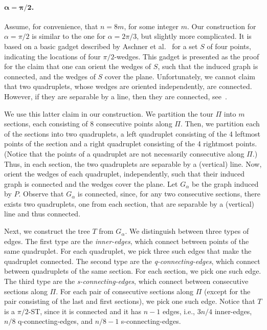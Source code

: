 \documentclass[11pt]{article}
\begin{document}
\paragraph{$\boldsymbol{\alpha=\pi/2}$.}
Assume, for convenience, that $n = 8m$, for some integer $m$.
Our construction for $\alpha=\pi/2$ is similar to the one for $\alpha=2\pi/3$, but slightly more complicated. It is based on a basic gadget described by Aschner et al.~\cite{AKM13} for a set $S$ of four points, indicating the locations of four $\pi/2$-wedges. This gadget is presented as the proof for the claim that one can orient the wedges of $S$, such that the induced graph is connected, and the wedges of $S$ cover the plane.
Unfortunately, we cannot claim that two quadruplets, whose wedges are oriented independently, are connected. However, if they are separable by a line, then they are connected, see~\cite{AKM13}. 

We use this latter claim in our construction.
We partition the tour $\Pi$ into $m$ sections, each consisting of 8 consecutive points along $\Pi$. Then, we partition each of the sections into two quadruplets, a left quadruplet consisting of the 4 leftmost points of the section and a right quadruplet consisting of the 4 rightmost points. (Notice that the points of a quadruplet are not necessarily consecutive along $\Pi$.) Thus, in each section, the two quadruplets are separable by a (vertical) line. Now, orient the wedges of each quadruplet, independently, such that their induced graph is connected and the wedges cover the plane. Let $G_{\alpha}$ be the graph induced by $P$. Observe that $G_{\alpha}$ is connected, since, for any two consecutive sections, there exists two quadruplets, one from each section, that are separable by a (vertical) line and thus connected.

Next, we construct the tree $T$ from $G_{\alpha}$. We distinguish between three types of edges. The first type are the {\em inner-edges}, which connect between points of the same quadruplet. For each quadruplet, we pick three such edges that make the quadruplet connected. The second type are the {\em q-connecting-edges}, which connect between quadruplets of the same section. For each section, we pick one such edge. The third type are the {\em s-connecting-edges}, which connect between consecutive sections along $\Pi$. For each pair of consecutive sections along $\Pi$ (except for the pair consisting of the last and first sections), we pick one such edge. Notice that $T$ is a $\pi/2$-ST, since it is connected and it has $n-1$ edges, i.e., $3n/4$ inner-edges, $n/8$ q-connecting-edges, and $n/8 - 1$ s-connecting-edges.
\end{document}

